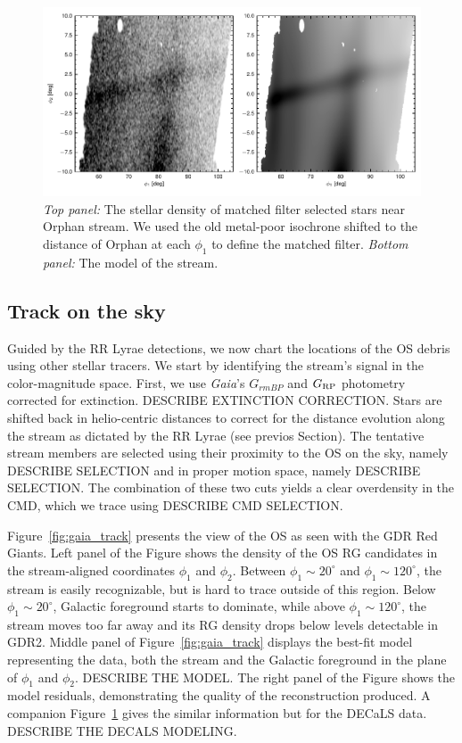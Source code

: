 \documentclass[a4paper,useAMS,usenatbib]{mnras}
\newcommand{\Gaia}{{\it Gaia}}
\begin{document}
%
\begin{figure}
\includegraphics{decals_map.pdf}
\caption{{\it Top panel:} The stellar density of matched filter
  selected stars near Orphan stream. We used the old metal-poor
  isochrone shifted to the distance of Orphan at each $\phi_1$ to
  define the matched filter. {\it Bottom panel:} The model of the
  stream.}
\label{fig:decals_track}
\end{figure}
%

\subsection{Track on the sky}

Guided by the RR Lyrae detections, we now chart the locations of the
OS debris using other stellar tracers. We start by identifying the
stream's signal in the color-magnitude space. First, we use \Gaia's
$G_{rm BP}$ and $G_{\rm RP}$ photometry corrected for
extinction. DESCRIBE EXTINCTION CORRECTION. Stars are shifted back in
helio-centric distances to correct for the distance evolution along
the stream as dictated by the RR Lyrae (see previos Section). The
tentative stream members are selected using their proximity to the OS
on the sky, namely DESCRIBE SELECTION and in proper motion space,
namely DESCRIBE SELECTION. The combination of these two cuts yields a
clear overdensity in the CMD, which we trace using DESCRIBE CMD
SELECTION. 

Figure~\ref{fig:gaia_track} presents the view of the OS as seen with
the GDR Red Giants. Left panel of the Figure shows the density of the
OS RG candidates in the stream-aligned coordinates $\phi_1$ and
$\phi_2$. Between $\phi_1\sim20^{\circ}$ and $\phi_1\sim120^{\circ}$,
the stream is easily recognizable, but is hard to trace outside of
this region. Below $\phi_1\sim20^{\circ}$, Galactic foreground starts
to dominate, while above $\phi_1\sim120^{\circ}$, the stream moves too
far away and its RG density drops below levels detectable in
GDR2. Middle panel of Figure~\ref{fig:gaia_track} displays the
best-fit model representing the data, both the stream and the Galactic
foreground in the plane of $\phi_1$ and $\phi_2$. DESCRIBE THE
MODEL. The right panel of the Figure shows the model residuals,
demonstrating the quality of the reconstruction produced. A companion
Figure~\ref{fig:decals_track} gives the similar information but for
the DECaLS data. DESCRIBE THE DECALS MODELING.
\end{document}
